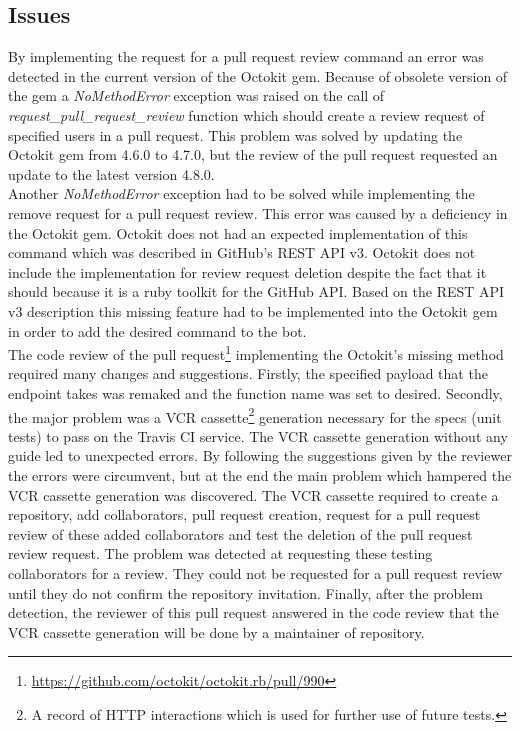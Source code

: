 \subsection{Issues}

By implementing the request for a pull request review command an error was detected in the current version of the Octokit gem. Because of obsolete version of the gem a \textit{NoMethodError} exception was raised on the call of \textit{request\_pull\_request\_review} function which should create a review request of specified users in a pull request. This problem was solved by updating the Octokit gem from 4.6.0 to 4.7.0, but the review of the pull request requested an update to the latest version 4.8.0.\\

Another \textit{NoMethodError} exception had to be solved while implementing the remove request for a pull request review. This error was caused by a deficiency in the Octokit gem. Octokit does not had an expected implementation of this command which was described in GitHub’s REST API v3. Octokit does not include the implementation for review request deletion despite the fact that it should because it is a ruby toolkit for the GitHub API. Based on the REST API v3 description this missing feature had to be implemented into the Octokit gem in order to add the desired command to the bot.\\

The code review of the pull request\footnote{\url{https://github.com/octokit/octokit.rb/pull/990}} implementing the Octokit's missing method required many changes and suggestions. Firstly, the specified payload that the endpoint takes was remaked and the function name was set to desired. Secondly, the major problem was a VCR cassette\footnote{A record of HTTP interactions which is used for further use of future tests.} generation necessary for the specs (unit tests) to pass on the Travis CI service. The VCR cassette generation without any guide led to unexpected errors. By following the suggestions given by the reviewer the errors were circumvent, but at the end the main problem which hampered the VCR cassette generation was discovered. The VCR cassette required to create a repository, add collaborators, pull request creation, request for a pull request review of these added collaborators and test the deletion of the pull request review request. The problem was detected at requesting these testing collaborators for a review. They could not be requested for a pull request review until they do not confirm the repository invitation. Finally, after the problem detection, the reviewer of this pull request answered in the code review that the VCR cassette generation will be done by a maintainer of repository.\\

